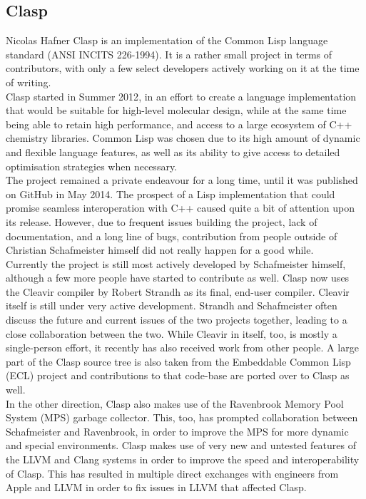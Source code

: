 \subsection{Clasp}{Nicolas Hafner}
Clasp\cite{clasp-github} is an implementation of the Common Lisp language standard (ANSI INCITS 226-1994). It is a rather small project in terms of contributors, with only a few select developers actively working on it at the time of writing. \\

Clasp started in Summer 2012\cite{clasp-timeline}, in an effort to create a language implementation that would be suitable for high-level molecular design, while at the same time being able to retain high performance, and access to a large ecosystem of C++ chemistry libraries\cite{clasp-cando}. Common Lisp was chosen due to its high amount of dynamic and flexible language features, as well as its ability to give access to detailed optimisation strategies when necessary\cite{clasp-talk}. \\

The project remained a private endeavour for a long time, until it was published on GitHub in May 2014\cite{clasp-github}. The prospect of a Lisp implementation that could promise seamless interoperation with C++ caused quite a bit of attention upon its release. However, due to frequent issues building the project, lack of documentation, and a long line of bugs, contribution from people outside of Christian Schafmeister himself did not really happen for a good while. \\

Currently the project is still most actively developed by Schafmeister himself, although a few more people have started to contribute as well. Clasp now uses the Cleavir compiler by Robert Strandh\cite{clasp-cleavir} as its final, end-user compiler. Cleavir itself is still under very active development. Strandh and Schafmeister often discuss the future and current issues of the two projects together, leading to a close collaboration between the two. While Cleavir in itself, too, is mostly a single-person effort, it recently has also received work from other people. A large part of the Clasp source tree is also taken from the Embeddable Common Lisp (ECL)\cite{clasp-ecl} project and contributions to that code-base are ported over to Clasp as well.\\

In the other direction, Clasp also makes use of the Ravenbrook Memory Pool System (MPS)\cite{clasp-mps} garbage collector. This, too, has prompted collaboration between Schafmeister and Ravenbrook, in order to improve the MPS for more dynamic and special environments. Clasp makes use of very new and untested features of the LLVM and Clang systems in order to improve the speed and interoperability of Clasp. This has resulted in multiple direct exchanges with engineers from Apple and LLVM in order to fix issues in LLVM that affected Clasp. \\

